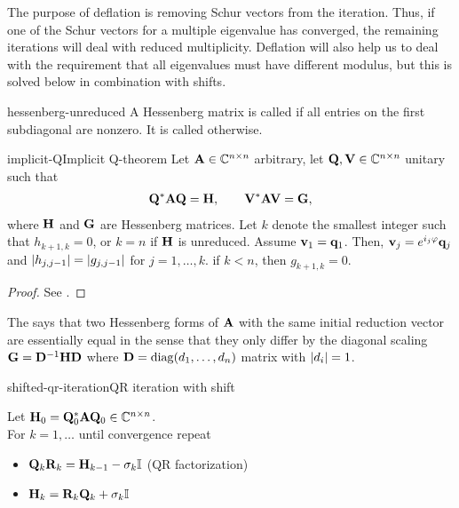 \begin{remark}
  The purpose of deflation is removing Schur vectors from the
  iteration. Thus, if one of the Schur vectors for a multiple
  eigenvalue has converged, the remaining iterations will deal with
  reduced multiplicity. Deflation will also help us to deal with the
  requirement that all eigenvalues must have different modulus, but
  this is solved below in combination with shifts.
\end{remark}

\begin{Definition}{hessenberg-unreduced}
  A Hessenberg matrix is called  if all entries on
  the first subdiagonal are nonzero. It is called 
  otherwise.
\end{Definition}

\begin{Theorem*}{implicit-Q}{Implicit Q-theorem}
  Let $\mathbf A\in\mathbb C^{n\times n}$ arbitrary, let $\mathbf Q,\mathbf V\in\mathbb C^{n\times n}$ unitary such that
  \begin{gather}
    \mathbf Q^*\mathbf A\mathbf Q = \mathbf H,\qquad \mathbf V^*\mathbf A\mathbf V = \mathbf G,
  \end{gather}
  where $\mathbf H$ and $\mathbf G$ are Hessenberg matrices. Let $k$ denote
  the smallest integer such that $h_{k+1,k} = 0$, or $k=n$ if $\mathbf H$
  is unreduced. Assume $\mathbf v_1 = \mathbf q_1$. Then,
  $\mathbf v_j = e^{i_j\varphi}\mathbf q_j$ and $\lvert h_{j,j-1}\rvert = \lvert g_{j,j-1}\rvert$
  for $j=1,\dots,k$. if $k<n$, then $g_{k+1,k} = 0$.
\end{Theorem*}

\begin{proof}
  See \cite[Theorem 7.4-2]{GolubVanLoan83}.
\end{proof}

\begin{remark}
  The  says that two Hessenberg forms of $\mathbf A$ with the same initial reduction vector are essentially equal in the sense that they only differ by the diagonal scaling $\mathbf G = \mathbf D^{-1}\mathbf H\mathbf D$ where $\mathbf D=\operatorname{diag}(d_1,\dots,d_n)$ matrix with $\lvert d_{i}\rvert = 1$.
\end{remark}

\begin{Algorithm*}{shifted-qr-iteration}{QR iteration with shift}
  
  Let $\mathbf H_0 = \mathbf Q_0^*\mathbf A\mathbf Q_0\in\mathbb C^{n\times n}$.\\
  For $k=1,\ldots$ until convergence repeat
  \begin{itemize}
  \item $\mathbf Q_k\mathbf R_k = \mathbf H_{k-1} - \sigma_k\mathbb I$ (QR factorization)
  \item $\mathbf H_{k} = \mathbf R_k\mathbf Q_k + \sigma_k\mathbb I$
  \end{itemize}
\end{Algorithm*}

